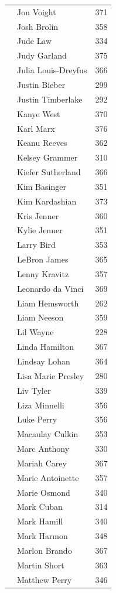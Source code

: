 \documentclass{article}
\begin{document}
{\begin{longtable}{p{}p{}r}
 & Jon Voight & 371 \\
 & Josh Brolin & 358 \\
 & Jude Law & 334 \\
 & Judy Garland & 375 \\
 & Julia Louis-Dreyfus & 366 \\
 & Justin Bieber & 299 \\
 & Justin Timberlake & 292 \\
 & Kanye West & 370 \\
 & Karl Marx & 376 \\
 & Keanu Reeves & 362 \\
 & Kelsey Grammer & 310 \\
 & Kiefer Sutherland & 366 \\
 & Kim Basinger & 351 \\
 & Kim Kardashian & 373 \\
 & Kris Jenner & 360 \\
 & Kylie Jenner & 351 \\
 & Larry Bird & 353 \\
 & LeBron James & 365 \\
 & Lenny Kravitz & 357 \\
 & Leonardo da Vinci & 369 \\
 & Liam Hemsworth & 262 \\
 & Liam Neeson & 359 \\
 & Lil Wayne & 228 \\
 & Linda Hamilton & 367 \\
 & Lindsay Lohan & 364 \\
 & Lisa Marie Presley & 280 \\
 & Liv Tyler & 339 \\
 & Liza Minnelli & 356 \\
 & Luke Perry & 356 \\
 & Macaulay Culkin & 353 \\
 & Marc Anthony & 330 \\
 & Mariah Carey & 367 \\
 & Marie Antoinette & 357 \\
 & Marie Osmond & 340 \\
 & Mark Cuban & 314 \\
 & Mark Hamill & 340 \\
 & Mark Harmon & 348 \\
 & Marlon Brando & 367 \\
 & Martin Short & 363 \\
 & Matthew Perry & 346 \\

\end{longtable}}
\end{document}
